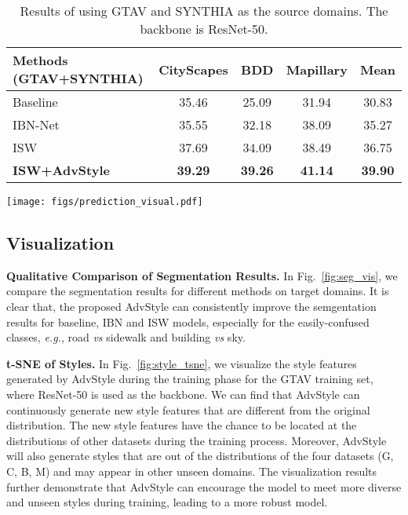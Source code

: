 \documentclass{article}
\newcommand{\ours}{AdvStyle\xspace}
\begin{document}
\begin{table}[t]
\centering
\footnotesize
\caption{Results of using GTAV and SYNTHIA as the source domains. The backbone is ResNet-50.}
\setlength{\tabcolsep}{3pt}
\begin{tabular}{l|c|c|c|c}
\toprule
Methods (GTAV+SYNTHIA) & \multicolumn{1}{c|}{CityScapes} & \multicolumn{1}{c|}{BDD} & \multicolumn{1}{c|}{Mapillary} & \multicolumn{1}{c}{Mean}\\
\midrule
{\cellcolor[gray]{1}}Baseline~\cite{robustnet} & 35.46  & 25.09& 31.94  & 30.83 \\
{\cellcolor[gray]{1}}IBN-Net~\cite{ibn}& 35.55  & 32.18 & 38.09   &35.27\\
{\cellcolor[gray]{1}}ISW~\cite{robustnet}& 37.69  & 34.09& 38.49 &36.75 \\
\midrule
{\cellcolor[gray]{1}}\textbf{ISW+AdvStyle} &\bf 39.29 & \bf 39.26& \bf 41.14& \bf 39.90\\
\bottomrule
\end{tabular}
\label{table:multi-source}
\end{table}


\begin{figure*}[!t]
\centering
\texttt{[image: figs/prediction\_visual.pdf]}
\caption{Qualitative comparison of segmentation results. Source: GTAV; Backbone: ResNet-50.}
\label{fig:seg_vis}
\end{figure*}





\subsection{Visualization}

\textbf{Qualitative Comparison of Segmentation Results.} In Fig.~\ref{fig:seg_vis}, we compare the segmentation  results  for different methods on target domains. It is clear that, the proposed \ours can consistently improve the semgentation results for baseline, IBN and ISW models, especially for the easily-confused classes, \textit{e.g.}, road \textit{vs} sidewalk and building \textit{vs} sky. 


\textbf{t-SNE of Styles.} In Fig.~\ref{fig:style_tsne}, we visualize the style features generated by \ours during the training phase for the GTAV training set, where ResNet-50 is used as the backbone. 
{We can find that AdvStyle can continuously generate new style features that are different from the original distribution. The new style features have the chance to be located at the distributions of other datasets during the training process.
Moreover, \ours will also generate styles that are out of the distributions of the four datasets (G, C, B, M) and may appear in other unseen domains.}
The visualization results further demonstrate that \ours can encourage the model to meet more diverse and unseen styles during training, leading to a more robust model.
\end{document}

